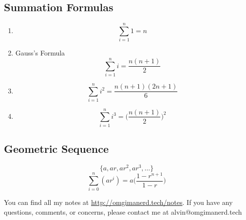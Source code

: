 \documentclass[letterpaper, 12pt]{math}
\begin{document}
\subsection*{Summation Formulas}
\begin{enumerate}
  \item
    \[ \sum_{i=1}^{n}1 = n \]
  \item Gauss's Formula
    \[ \sum_{i=1}^{n}i = \frac{n(n+1)}{2} \]
  \item
    \[ \sum_{i=1}^{n}i^{2} = \frac{n(n+1)(2n+1)}{6} \]
  \item
    \[ \sum_{i=1}^{n}i^{3} = \bigg(\frac{n(n+1)}{2}\bigg)^{2} \]
\end{enumerate}

\subsection*{Geometric Sequence}
\[ \{a,ar,ar^{2},ar^{3},\dots\} \]
\[ \sum_{i=0}^{n}(ar^{i}) = a\bigg(\frac{1-r^{n+1}}{1-r}\bigg) \]

\begin{center}
  You can find all my notes at \url{http://omgimanerd.tech/notes}. If you have
  any questions, comments, or concerns, please contact me at
  alvin@omgimanerd.tech
\end{center}
\end{document}
